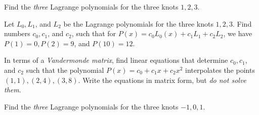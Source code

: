 \documentclass[12pt,fleqn]{exam}
\begin{document}
\begin{questions}
\begin{solution}%

\end{solution}



\question   Find the \emph{three}  Lagrange polynomials for the three knots \(1,2,3\).


\begin{solution}%

\end{solution}






\question   Let \(L_0, L_1\), and \(L_2\) be the  Lagrange polynomials for the three knots \(1,2,3\).  Find numbers \(c_0, c_1\), and \(c_2\), such that  for \(P(x) = c_0 L_0(x) + c_1 L_1 + c_2 L_2\),
we have \(P(1)  = 0, P(2) = 9\), and  \(P(10) = 12\).

\begin{solution}%

\end{solution}




\question [5] In terms of a \emph{Vandermonde matrix}, find linear equations that determine \(c_0,c_1\), and \(c_2\) such that the
polynomial \(P(x) = c_0  + c_1 x + c_2 x^2\) interpolates the points \((1,1), (2,4), (3,8)\). Write the equations in matrix form, but \emph{do not solve them}.

\begin{solution}%

\end{solution}



\question [5] Find the \emph{three}  Lagrange polynomials for the three knots \(-1,0,1\).


\begin{solution}%

\end{solution}




\end{questions}
\end{document}
